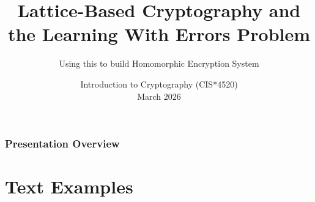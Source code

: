\documentclass[
	11pt, %
]{beamer}
\title[Lattices and Learning with Errors]{Lattice-Based Cryptography and the Learning With Errors Problem} %
\subtitle{Using this to build Homomorphic Encryption System} %
\author[Adil Baig \and Sabrina Haniff \and Stella Rovazzi] %
\institute[UC]{University of Guelph} %
\date[\today]{Introduction to Cryptography (CIS*4520)\\ March 2026} %
\begin{document}

\begin{frame}
	\titlepage %
\end{frame}



\begin{frame}
	\frametitle{Presentation Overview} %
	
	\tableofcontents %
\end{frame}


\section{Text Examples} %
\end{document}
